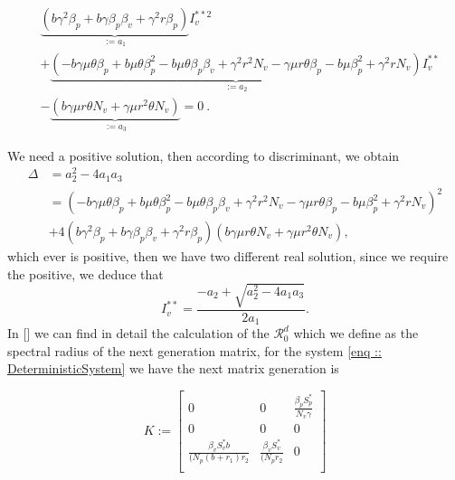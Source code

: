 \begin{equation}\label{eqn::QuadraticInfectedFP}
    \begin{aligned}
    	&\underbrace{
    		(
    		b \gamma^2 \beta_p + 
    		b \gamma \beta_p \beta_v + 
    		\gamma^2 r \beta_p
    		)
    	    }_{:=a_1} I_v^{**2}\\
    	&+ 
    	\underbrace{
    	(-b \gamma \mu \theta \beta_p + 
    		b \mu \theta \beta_p ^ 2 - 
    		b \mu \theta \beta_p \beta_v + 
    		\gamma^2 r^2 N_v - 
    		\gamma \mu r 
    		\theta \beta_p - 
    		b \mu \beta_p^ 2 + 
    		\gamma ^ 2 r N_v
    		)
    		}_{:=a_2} I^{**}_v \\
    		&- 
    	\underbrace{
    	(b\gamma\mu r\theta N_v+\gamma\mu r^2\theta N_v
    	)}_{:=a_3}=0 \ .
\end{aligned}
\end{equation}

We need a positive solution, then according to discriminant, we obtain
\begin{equation*}
	\begin{aligned}
		\Delta &= 
		a_2  ^ 2 -  4a_1 a_3
		\\
		&=
			(
				- b \gamma \mu \theta \beta_p +
				b \mu \theta \beta_p^2 -
				b \mu \theta \beta_p \beta_v + 
				\gamma ^ 2 r ^ 2 N_v - 
				\gamma \mu r \theta \beta_p - 
				b \mu \beta_p ^ 2 + 
				\gamma ^ 2 r N_v 
			) ^ 2
		\\
		& +  
		4( 
			b \gamma ^ 2 \beta_p + 
			b \gamma \beta_p
			\beta_v + 
			\gamma^2 r \beta_p
		)
		(
			b \gamma \mu r 
			\theta N_v + 
			\gamma \mu r ^ 2 \theta N_v
		),			
	\end{aligned}	
\end{equation*}
which ever is positive, then we have two different real solution, 
since we require the positive, we deduce that
\begin{equation*}
	I^{**}_{v} = 
		\frac{
			-a_2 + 
			\sqrt{a_2^2 - 4a_1 a_3}}%
		{2a_1}.
\end{equation*}
In [] we can find in detail the calculation of the $ \mathcal{R}^d_0$ which we define as the spectral radius of the next generation matrix, for the system \eqref{enq :: DeterministicSystem} we have the next matrix generation is

\begin{equation}\label{Mtx::NextGenerationMatrix}
    K:=
        \begin{bmatrix}
        0 & 0 &\frac{\beta_p S^*_p}{N_v \gamma} \\
        0 & 0 & 0 \\
        \frac{\beta_v S^*_v b}{(N_p (b+r_1) r_2} & \frac{\beta_v S^*_v}{(N_p r_2} & 0\\
        \end{bmatrix}
\end{equation}
    


